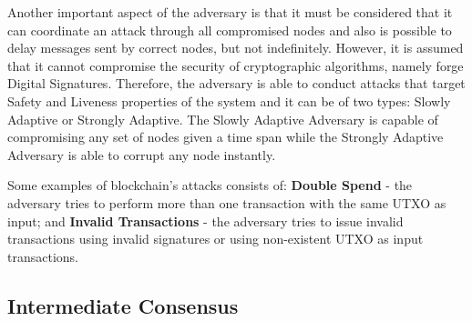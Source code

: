Another important aspect of the adversary is that it must be considered that it can coordinate an attack through all compromised nodes and also is possible to delay messages sent by correct nodes, but not indefinitely. However, it is assumed that it cannot compromise the security of cryptographic algorithms, namely forge Digital Signatures. Therefore, the adversary is able to conduct attacks that target Safety and Liveness properties of the system and it can be of two types: Slowly Adaptive or Strongly Adaptive. The Slowly Adaptive Adversary is capable of compromising any set of nodes given a time span while the Strongly Adaptive Adversary is able to corrupt any node instantly.

Some examples of blockchain's attacks consists of: \textbf{Double Spend} - the adversary tries to perform more than one transaction with the same \gls{UTXO} as input; and \textbf{Invalid Transactions} - the adversary tries to issue invalid transactions using invalid signatures or using non-existent \gls{UTXO} as input transactions.


% 
%     

\subsection{Intermediate Consensus}
\label{sub:intermediate_consensus}

